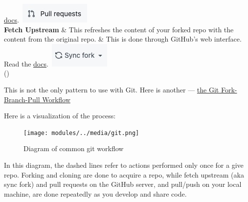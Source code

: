 \documentclass[
  letterpaper,
  DIV=11,
  numbers=noendperiod]{scrreport}
\begin{document}
\begin{longtable}[]
\href{https://docs.github.com/en/pull-requests}{docs}.~\includegraphics{modules/../media/pull-request-button.jpg} \\
\textbf{Fetch Upstream} & This refreshes the content of your forked repo
with the content from the original repo. & This is done through GitHub's
web interface. Read the
\href{https://docs.github.com/en/pull-requests/collaborating-with-pull-requests/working-with-forks/syncing-a-fork}{docs}.~\includegraphics{modules/../media/sync-fork.jpg} \\
\bottomrule()
\end{longtable}

\begin{tcolorbox}[enhanced jigsaw, opacityback=0, bottomtitle=1mm, left=2mm, rightrule=.15mm, coltitle=black, arc=.35mm, opacitybacktitle=0.6, titlerule=0mm, colback=white, colbacktitle=quarto-callout-note-color!10!white, toptitle=1mm, title=\textcolor{quarto-callout-note-color}{\faInfo}\hspace{0.5em}{Note}, bottomrule=.15mm, toprule=.15mm, breakable, colframe=quarto-callout-note-color-frame, leftrule=.75mm]

This is not the only pattern to use with Git. Here is another ---
\href{https://www.tomasbeuzen.com/post/git-fork-branch-pull/}{the Git
Fork-Branch-Pull Workflow}

\end{tcolorbox}

Here is a visualization of the process:

\begin{figure}

{\centering \texttt{[image: modules/../media/git.png]}

}

\caption{Diagram of common git workflow}

\end{figure}

In this diagram, the dashed lines refer to actions performed only once
for a give repo. Forking and cloning are done to acquire a repo, while
fetch upstream (aka sync fork) and pull requests on the GitHub server,
and pull/push on your local machine, are done repeatedly as you develop
and share code.
\end{document}

